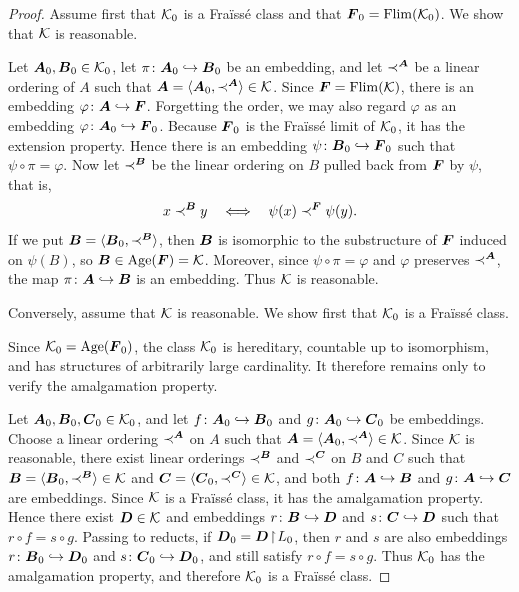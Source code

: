 \begin{proof}
    Assume first that \(\mathcal{K}_0\) is a Fraïssé class and that \(\boldsymbol{F}_0=\operatorname{Flim}(\mathcal{K}_0)\).
    We show that \(\mathcal{K}\) is reasonable.

    Let \(\boldsymbol{A}_0,\boldsymbol{B}_0\in\mathcal{K}_0\), let \(\pi\colon \boldsymbol{A}_0\hookrightarrow \boldsymbol{B}_0\) be an embedding, and let \(\prec^{\boldsymbol{A}}\) be a linear ordering of \(A\) such that \(\boldsymbol{A}=\langle \boldsymbol{A}_0,\prec^{\boldsymbol{A}}\rangle\in\mathcal{K}\). Since \(\boldsymbol{F}=\operatorname{Flim}(\mathcal{K})\), there is an embedding \(\varphi\colon \boldsymbol{A}\hookrightarrow \boldsymbol{F}\). Forgetting the order, we may also regard \(\varphi\) as an embedding \(\varphi\colon \boldsymbol{A}_0\hookrightarrow \boldsymbol{F}_0\). Because \(\boldsymbol{F}_0\) is the Fraïssé limit of \(\mathcal{K}_0\), it has the extension property. Hence there is an embedding \(\psi\colon \boldsymbol{B}_0\hookrightarrow \boldsymbol{F}_0\) such that \(\psi\circ\pi=\varphi\).
    Now let \(\prec^{\boldsymbol{B}}\) be the linear ordering on \(B\) pulled back from \(\boldsymbol{F}\) by \(\psi\), that is,
    \[
        x\prec^{\boldsymbol{B}} y
        \quad\Longleftrightarrow\quad
        \psi(x)\prec^{\boldsymbol{F}}\psi(y).
    \]
    If we put \(\boldsymbol{B}=\langle \boldsymbol{B}_0,\prec^{\boldsymbol{B}}\rangle\), then \(\boldsymbol{B}\) is isomorphic to the substructure of \(\boldsymbol{F}\) induced on \(\psi(B)\), so \(\boldsymbol{B}\in\operatorname{Age}(\boldsymbol{F})=\mathcal{K}\). Moreover, since \(\psi\circ\pi=\varphi\) and \(\varphi\) preserves \(\prec^{\boldsymbol{A}}\), the map \(\pi\colon \boldsymbol{A}\hookrightarrow \boldsymbol{B}\) is an embedding. Thus \(\mathcal{K}\) is reasonable.

    Conversely, assume that \(\mathcal{K}\) is reasonable. We show first that \(\mathcal{K}_0\) is a Fraïssé class.

    Since \(\mathcal{K}_0=\operatorname{Age}(\boldsymbol{F}_0)\),
    the class \(\mathcal{K}_0\) is hereditary, countable up to isomorphism, and has structures of arbitrarily large cardinality. It therefore remains only to verify the amalgamation property.

    Let \(\boldsymbol{A}_0,\boldsymbol{B}_0,\boldsymbol{C}_0\in\mathcal{K}_0\), and let \(f\colon \boldsymbol{A}_0\hookrightarrow \boldsymbol{B}_0\) and \(g\colon \boldsymbol{A}_0\hookrightarrow \boldsymbol{C}_0\) be embeddings. Choose a linear ordering \(\prec^{\boldsymbol{A}}\) on \(A\) such that \(\boldsymbol{A}=\langle \boldsymbol{A}_0,\prec^{\boldsymbol{A}}\rangle\in\mathcal{K}\).
    Since \(\mathcal{K}\) is reasonable, there exist linear orderings \(\prec^{\boldsymbol{B}}\) and \(\prec^{\boldsymbol{C}}\) on \(B\) and \(C\) such that \(\boldsymbol{B}=\langle \boldsymbol{B}_0,\prec^{\boldsymbol{B}}\rangle\in\mathcal{K}\) and \(\boldsymbol{C}=\langle \boldsymbol{C}_0,\prec^{\boldsymbol{C}}\rangle\in\mathcal{K}\), and both \(f\colon \boldsymbol{A}\hookrightarrow \boldsymbol{B}\) and \(g\colon \boldsymbol{A}\hookrightarrow \boldsymbol{C}\) are embeddings. Since \(\mathcal{K}\) is a Fraïssé class, it has the amalgamation property. Hence there exist \(\boldsymbol{D}\in\mathcal{K}\) and embeddings \(r\colon \boldsymbol{B}\hookrightarrow \boldsymbol{D}\) and \(s\colon \boldsymbol{C}\hookrightarrow \boldsymbol{D}\) such that \(r\circ f=s\circ g\). Passing to reducts, if \(\boldsymbol{D}_0=\boldsymbol{D}\!\restriction\!L_0\), then \(r\) and \(s\) are also embeddings \(r\colon \boldsymbol{B}_0\hookrightarrow \boldsymbol{D}_0\) and \(s\colon \boldsymbol{C}_0\hookrightarrow \boldsymbol{D}_0\), and still satisfy \(r\circ f=s\circ g\).
    Thus \(\mathcal{K}_0\) has the amalgamation property, and therefore \(\mathcal{K}_0\) is a Fraïssé class.


\end{proof}
